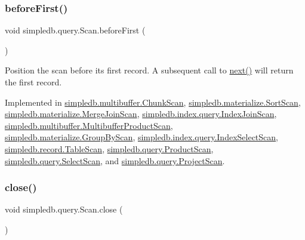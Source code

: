 \subsubsection{\texorpdfstring{before\+First()}{beforeFirst()}}
{\footnotesize\ttfamily void simpledb.\+query.\+Scan.\+before\+First (\begin{DoxyParamCaption}{ }\end{DoxyParamCaption})}

Position the scan before its first record. A subsequent call to \hyperlink{interfacesimpledb_1_1query_1_1Scan_a5fc77b7c76d91f89f6c09ac4f15ef351}{next()} will return the first record. 

Implemented in \hyperlink{classsimpledb_1_1multibuffer_1_1ChunkScan_acd915cad8a1a21a0838eab8c4ee47935}{simpledb.\+multibuffer.\+Chunk\+Scan}, \hyperlink{classsimpledb_1_1materialize_1_1SortScan_aa9fed9077d78dcbd50a0c1504e5b5c86}{simpledb.\+materialize.\+Sort\+Scan}, \hyperlink{classsimpledb_1_1materialize_1_1MergeJoinScan_a171db3d5aad009a8f8b93dc4742f2a3a}{simpledb.\+materialize.\+Merge\+Join\+Scan}, \hyperlink{classsimpledb_1_1index_1_1query_1_1IndexJoinScan_abbdd650c312ffc1ba633f57f5988fb85}{simpledb.\+index.\+query.\+Index\+Join\+Scan}, \hyperlink{classsimpledb_1_1multibuffer_1_1MultibufferProductScan_ab8cc812f19837c2f6b559d2f6734d858}{simpledb.\+multibuffer.\+Multibuffer\+Product\+Scan}, \hyperlink{classsimpledb_1_1materialize_1_1GroupByScan_aa8e3233026ee744d9037288ef0fffb3d}{simpledb.\+materialize.\+Group\+By\+Scan}, \hyperlink{classsimpledb_1_1index_1_1query_1_1IndexSelectScan_a4d7ce96f840cfc13840b3dcbee65801a}{simpledb.\+index.\+query.\+Index\+Select\+Scan}, \hyperlink{classsimpledb_1_1record_1_1TableScan_a2b5a99c638ace01efded11dd93cf9240}{simpledb.\+record.\+Table\+Scan}, \hyperlink{classsimpledb_1_1query_1_1ProductScan_a2b5520d561ce26d401b4744f637a4d76}{simpledb.\+query.\+Product\+Scan}, \hyperlink{classsimpledb_1_1query_1_1SelectScan_a5ba571c7504c39532b8a211f804e1726}{simpledb.\+query.\+Select\+Scan}, and \hyperlink{classsimpledb_1_1query_1_1ProjectScan_ab34d4470b97f47e22879911fb71eeca6}{simpledb.\+query.\+Project\+Scan}.

\mbox{\label{interfacesimpledb_1_1query_1_1Scan_a260f40a8c82edaa00398bea9d698933c}} 
\subsubsection{\texorpdfstring{close()}{close()}}
{\footnotesize\ttfamily void simpledb.\+query.\+Scan.\+close (\begin{DoxyParamCaption}{ }\end{DoxyParamCaption})}

